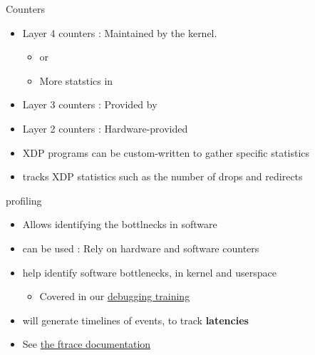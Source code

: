 \begin{frame}{Counters}
	\begin{itemize}
		\item Layer 4 counters : Maintained by the kernel.
			\begin{itemize}
				\item {} or 
				\item More statstics in 
			\end{itemize}
		\item Layer 3 counters : Provided by 
		\item Layer 2 counters : Hardware-provided
		\item XDP programs can be custom-written to gather specific statistics
		\item {} tracks XDP statistics such as the number of drops and redirects
	\end{itemize}
\end{frame}

\begin{frame}{profiling}
	\begin{itemize}
		\item Allows identifying the bottlnecks in software
		\item {} can be used : Rely on hardware and software counters
		\item {} help identify software bottlenecks, in kernel and userspace
			\begin{itemize}
				\item Covered in our \href{https://bootlin.com/training/debugging/}{debugging training}
			\end{itemize}
		\item {} will generate timelines of events, to track \textbf{latencies}
		\item See \href{https://docs.kernel.org/trace/ftrace.html}{the ftrace documentation}
	\end{itemize}
\end{frame}

